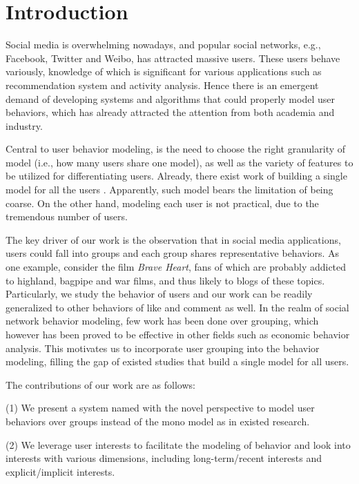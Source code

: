\section{Introduction}
\label{sec:intro}

Social media is overwhelming nowadays, and popular social networks, e.g., Facebook, Twitter and Weibo, has attracted  massive users.
These users behave variously, knowledge of which is significant for various applications such as recommendation system and activity analysis.
Hence there is an emergent demand of developing systems and algorithms that could properly model user behaviors, which has already attracted the attention from both academia and industry.

Central to user behavior modeling, is the need to choose the right granularity of model (i.e., how many users share one model), as well as the variety of features to be utilized for differentiating users.
Already, there exist work of building a single model for all the users \cite{IEEEexample:conf/wsdm/FengW13,IEEEexample:conf/ijcai/ZhangLTCL13,IEEEexample:journals/tkdd/ZhangTLLX15}.
Apparently, such model bears the limitation of being coarse.
On the other hand, modeling each user is not practical, due to the tremendous number of users.

The key driver of our work is the observation that in social media applications, users could fall into groups and each group shares representative behaviors.
%
As one example, consider the film \textit{Brave Heart}, fans of which are probably addicted to highland, bagpipe and war films, and thus likely to \ret{} blogs of these topics.
Particularly, we study the \retg{} behavior of users and our work can be readily generalized to other behaviors of like and comment as well.
In the realm of social network behavior modeling, few work has been done over grouping, which however has been proved to be effective in other fields such as economic behavior analysis.
This motivates us to incorporate user grouping into the \retg{} behavior modeling, filling the gap of existed studies that build a single model for all users.

The contributions of our work are as follows:

\stab(1) We present a system named \sys{} with the novel perspective to model user behaviors over groups instead of the mono model as in existed research.

\stab(2) We leverage user interests to facilitate the modeling of \retg{} behavior and look into interests with various dimensions, including long-term/recent interests and explicit/implicit interests.

